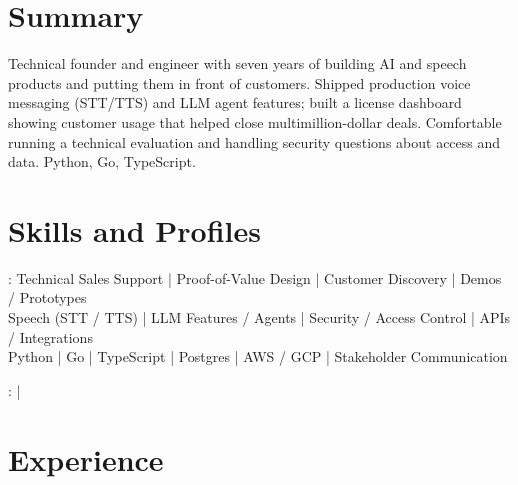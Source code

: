 \documentclass[print]{jack-resume}
\begin{document}
\pagecolor{darkmodeBackground}


\begin{minipage}[t][1cm][t]{.03\textwidth}
    \hfill
\end{minipage}

\section{Summary}
Technical founder and engineer with seven years of building AI and speech products and putting them in front of customers. Shipped production voice messaging (STT/TTS) and LLM agent features; built a license dashboard showing customer usage that helped close multimillion-dollar deals. Comfortable running a technical evaluation and handling security questions about access and data. Python, Go, TypeScript.
\sectionsep

\section{Skills and Profiles}
:
Technical Sales Support \hfill | \hfill
Proof-of-Value Design \hfill | \hfill
Customer Discovery \hfill | \hfill
Demos / Prototypes \\
\hspace{1.0cm} Speech (STT / TTS) \hfill | \hfill
LLM Features / Agents \hfill | \hfill
Security / Access Control \hfill | \hfill
APIs / Integrations \\
\hspace{1.0cm} Python \hfill | \hfill
Go \hfill | \hfill
TypeScript \hfill | \hfill
Postgres \hfill | \hfill
AWS / GCP \hfill | \hfill
Stakeholder Communication \\

\raggedright{
    :
      \href{https://www.linkedin.com/in/jack-sturtevant/}{ \ExternalLink} |
     \href{https://github.com/jacksturt}{ \ExternalLink}}

\section{Experience}
\end{document}
